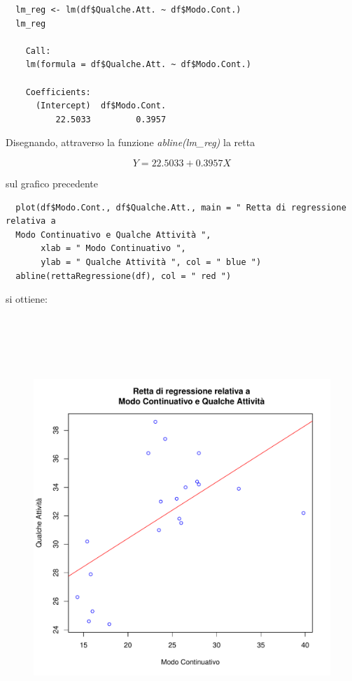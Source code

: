 \vspace{5mm}
\begin{lstlisting}
  lm_reg <- lm(df$Qualche.Att. ~ df$Modo.Cont.)
  lm_reg

    Call:
    lm(formula = df$Qualche.Att. ~ df$Modo.Cont.)
    
    Coefficients:
      (Intercept)  df$Modo.Cont.  
          22.5033         0.3957    
\end{lstlisting}
\vspace{5mm}
 
Disegnando, attraverso la funzione \textit{abline(lm\_reg)} la retta

\[Y = 22.5033 + 0.3957X\]

sul grafico precedente

\vspace{5mm}
\begin{lstlisting}
  plot(df$Modo.Cont., df$Qualche.Att., main = " Retta di regressione relativa a
  Modo Continuativo e Qualche Attività ",
       xlab = " Modo Continuativo ",
       ylab = " Qualche Attività ", col = " blue ")
  abline(rettaRegressione(df), col = " red ")
\end{lstlisting}
\vspace{5mm}

si ottiene:

\begin{figure}[!htbp]
    \centering
    \includegraphics[height=16cm]{ProgettoSAD/capitoli/images/s_desc_biv/retta_regressione.pdf}
\end{figure}


